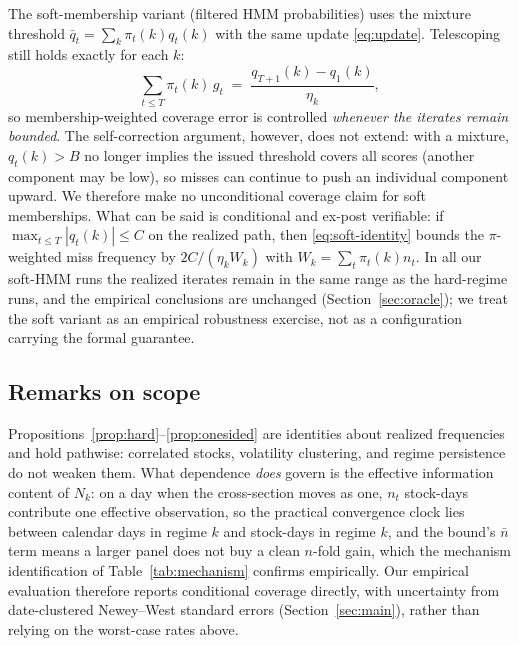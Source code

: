 The soft-membership variant (filtered HMM probabilities) uses the mixture
threshold $\bar q_t = \sum_k \pi_t(k) q_t(k)$ with the same update
\eqref{eq:update}. Telescoping still holds exactly for each $k$:
\begin{equation}\label{eq:soft-identity}
  \sum_{t \le T} \pi_t(k)\, g_t
  \;=\; \frac{ q_{T+1}(k) - q_1(k) }{ \eta_k },
\end{equation}
so membership-weighted coverage error is controlled \emph{whenever the
iterates remain bounded}. The self-correction argument, however, does not
extend: with a mixture, $q_t(k) > B$ no longer implies the issued
threshold covers all scores (another component may be low), so misses can
continue to push an individual component upward. We therefore make no
unconditional coverage claim for soft memberships. What can be said is
conditional and ex-post verifiable: if $\max_{t \le T} |q_t(k)| \le C$ on
the realized path, then \eqref{eq:soft-identity} bounds the
$\pi$-weighted miss frequency by $2C / (\eta_k W_k)$ with
$W_k = \sum_t \pi_t(k) n_t$. In all our soft-HMM runs the realized
iterates remain in the same range as the hard-regime runs, and the
empirical conclusions are unchanged (Section~\ref{sec:oracle}); we treat
the soft variant as an empirical robustness exercise, not as a
configuration carrying the formal guarantee.

\subsection{Remarks on scope}

\begin{remark}\label{rem:dependence}
Propositions~\ref{prop:hard}--\ref{prop:onesided} are identities about
realized frequencies and hold pathwise: correlated stocks, volatility
clustering, and regime persistence do not weaken them. What dependence
\emph{does} govern is the effective information content of $N_k$: on a day
when the cross-section moves as one, $n_t$ stock-days contribute one
effective observation, so the practical convergence clock lies between
calendar days in regime $k$ and stock-days in regime $k$, and the bound's
$\bar n$ term means a larger panel does not buy a clean $n$-fold gain,
which the mechanism identification of Table~\ref{tab:mechanism} confirms
empirically. Our
empirical evaluation therefore reports conditional coverage directly, with
uncertainty from date-clustered Newey--West standard errors
(Section~\ref{sec:main}), rather than relying on the worst-case rates
above.
\end{remark}

